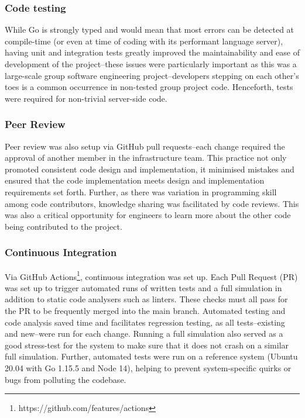 \subsubsection{Code testing}

While Go is strongly typed and would mean that most errors can be detected at compile-time (or even at time of coding with its performant language server), having unit and integration tests greatly improved the maintainability and ease of development of the project--these issues were particularly important as this was a large-scale group software engineering project--developers stepping on each other's toes is a common occurrence in non-tested group project code. Henceforth, tests were required for non-trivial server-side code.

\subsubsection{Peer Review}

Peer review was also setup via GitHub pull requests--each change required the approval of another member in the infrastructure team. This practice not only promoted consistent code design and implementation, it minimised mistakes and ensured that the code implementation meets design and implementation requirements set forth. Further, as there was variation in programming skill among code contributors, knowledge sharing was facilitated by code reviews. This was also a critical opportunity for engineers to learn more about the other code being contributed to the project.

\subsubsection{Continuous Integration}

Via GitHub Actions\footnote{https://github.com/features/actions}, continuous integration was set up. Each Pull Request (PR) was set up to trigger automated runs of written tests and a full simulation in addition to static code analysers such as linters. These checks must all pass for the PR to be frequently merged into the main branch. Automated testing and code analysis saved time and facilitates regression testing, as all tests--existing and new--were run for each change. Running a full simulation also served as a good stress-test for the system to make sure that it does not crash on a similar full simulation. Further, automated tests were run on a reference system (Ubuntu 20.04 with Go 1.15.5 and Node 14), helping to prevent system-specific quirks or bugs from polluting the codebase.

